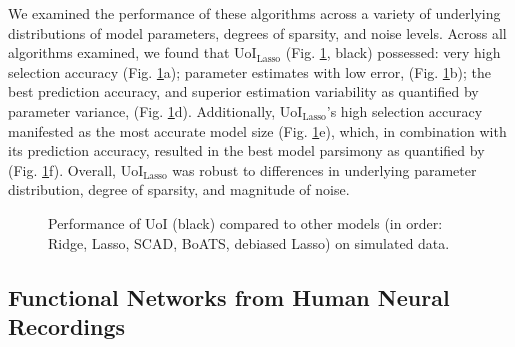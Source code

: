 \documentclass[letterpaper, 10 pt, conference]{ieeeconf}  %
\begin{document}
We examined the performance of these algorithms across a variety of underlying distributions of model parameters, degrees of sparsity, and noise levels. Across all algorithms examined, we found that UoI$_{\text{Lasso}}$ (Fig. \ref{fig:simulated}, black) possessed: very high selection accuracy (Fig. \ref{fig:simulated}a); parameter estimates with low error, (Fig. \ref{fig:simulated}b); the best prediction accuracy,  and superior estimation variability as quantified by parameter variance, (Fig. \ref{fig:simulated}d). Additionally, UoI$_{\text{Lasso}}$'s high selection accuracy manifested as the most accurate model size (Fig. \ref{fig:simulated}e), which, in combination with its prediction accuracy, resulted in the best model parsimony as quantified by (Fig. \ref{fig:simulated}f). Overall, UoI$_{\text{Lasso}}$ was robust to differences in underlying parameter distribution, degree of sparsity, and magnitude of noise.
\begin{figure}[t]
    \centering
    \caption{Performance of UoI (black) compared to other models (in order: Ridge, Lasso, SCAD, BoATS, debiased Lasso) on simulated data.}
    \label{fig:simulated}
\end{figure}

\subsection{Functional Networks from Human Neural Recordings}
\end{document}
